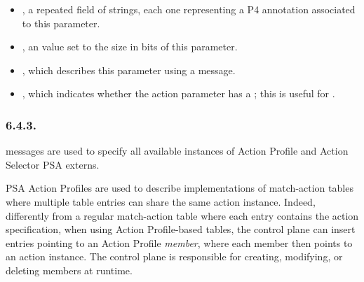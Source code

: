 \documentclass[11pt]{article}
\begin{document}
{\begin{itemize}
\begin{itemize}[noitemsep,topsep=\mdcompacttopsep]
\item{}, a repeated field of strings, each one representing a P4
annotation associated to this parameter.%

\item{}, an  value set to the size in bits of this parameter.%

\item{}, which describes this parameter using a  message.%

\item{}, which indicates whether the action parameter has a
; this is useful for
.%
\end{itemize}%
\end{itemize}%

\subsubsection{6.4.3.\hspace*{0.5em}}\label{sec-p4info-action-profile}%

\noindent{} messages are used to specify all available instances of Action
Profile and Action Selector PSA externs.%

PSA Action Profiles are used to describe implementations of match-action tables
where multiple table entries can share the same action instance. Indeed,
differently from a regular match-action table where each entry contains the
action specification, when using Action Profile-based tables, the control plane
can insert entries pointing to an Action Profile \emph{member}, where each member
then points to an action instance. The control plane is responsible for
creating, modifying, or deleting members at runtime.%

}
\end{document}

